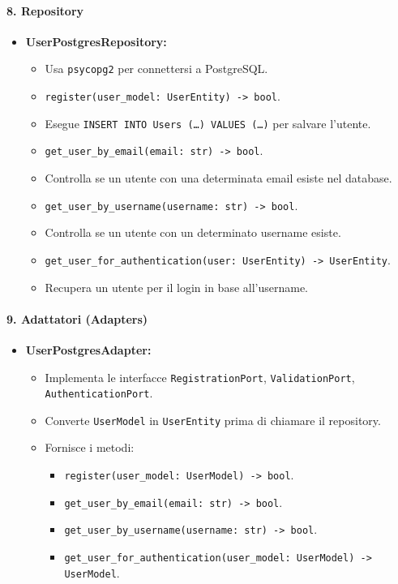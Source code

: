     \paragraph{8. Repository}
    \begin{itemize}
        \item \textbf{UserPostgresRepository:}
        \begin{itemize}
            \item Usa \texttt{psycopg2} per connettersi a PostgreSQL.
            \item \texttt{register(user\_model: UserEntity) -> bool}.
            \item Esegue \texttt{INSERT INTO Users (\dots) VALUES (\dots)} per salvare l'utente.
            \item \texttt{get\_user\_by\_email(email: str) -> bool}.
            \item Controlla se un utente con una determinata email esiste nel database.
            \item \texttt{get\_user\_by\_username(username: str) -> bool}.
            \item Controlla se un utente con un determinato username esiste.
            \item \texttt{get\_user\_for\_authentication(user: UserEntity) -> UserEntity}.
            \item Recupera un utente per il login in base all'username.
        \end{itemize}
    \end{itemize}

    \paragraph{9. Adattatori (Adapters)}
    \begin{itemize}
        \item \textbf{UserPostgresAdapter:}
        \begin{itemize}
            \item Implementa le interfacce \texttt{RegistrationPort}, \texttt{ValidationPort}, \texttt{AuthenticationPort}.
            \item Converte \texttt{UserModel} in \texttt{UserEntity} prima di chiamare il repository.
            \item Fornisce i metodi:
            \begin{itemize}
                \item \texttt{register(user\_model: UserModel) -> bool}.
                \item \texttt{get\_user\_by\_email(email: str) -> bool}.
                \item \texttt{get\_user\_by\_username(username: str) -> bool}.
                \item \texttt{get\_user\_for\_authentication(user\_model: UserModel) -> UserModel}.
            \end{itemize}
        \end{itemize}
    \end{itemize}

